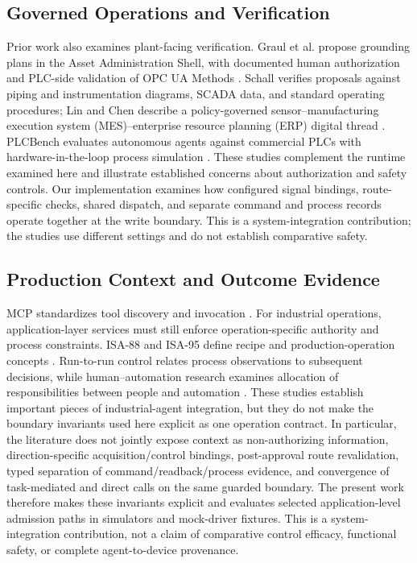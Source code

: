 \documentclass[journal]{IEEEtran}
\begin{document}
\subsection{Governed Operations and Verification}
Prior work also examines plant-facing verification. Graul et al. propose grounding plans in the Asset Administration Shell, with documented human authorization and PLC-side validation of OPC UA Methods \cite{graul2026aas}. Schall verifies proposals against piping and instrumentation diagrams, SCADA data, and standard operating procedures; Lin and Chen describe a policy-governed sensor--manufacturing execution system (MES)--enterprise resource planning (ERP) digital thread \cite{schall2026safe,lin2026agentic}. PLCBench evaluates autonomous agents against commercial PLCs with hardware-in-the-loop process simulation \cite{zhou2026plcbench}. These studies complement the runtime examined here and illustrate established concerns about authorization and safety controls. Our implementation examines how configured signal bindings, route-specific checks, shared dispatch, and separate command and process records operate together at the write boundary. This is a system-integration contribution; the studies use different settings and do not establish comparative safety.

\subsection{Production Context and Outcome Evidence}
MCP standardizes tool discovery and invocation \cite{mcp2026}. For industrial operations, application-layer services must still enforce operation-specific authority and process constraints. ISA-88 and ISA-95 define recipe and production-operation concepts \cite{isa88_2010,isa95_2025}. Run-to-run control relates process observations to subsequent decisions, while human--automation research examines allocation of responsibilities between people and automation \cite{moyne2001r2r,parasuraman2000model}. These studies establish important pieces of industrial-agent integration, but they do not make the boundary invariants used here explicit as one operation contract. In particular, the literature does not jointly expose context as non-authorizing information, direction-specific acquisition/control bindings, post-approval route revalidation, typed separation of command/readback/process evidence, and convergence of task-mediated and direct calls on the same guarded boundary. The present work therefore makes these invariants explicit and evaluates selected application-level admission paths in simulators and mock-driver fixtures. This is a system-integration contribution, not a claim of comparative control efficacy, functional safety, or complete agent-to-device provenance.
\end{document}
